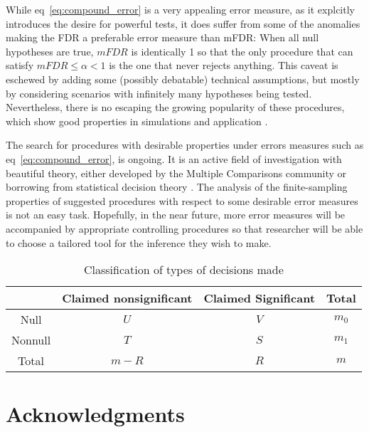 \documentclass[draft,12pt]{article}
\begin{document}
While eq~\ref{eq:compound_error} is a very appealing error measure, as it explcitly introduces the desire for powerful tests, it does suffer from some of the anomalies making the FDR a preferable error measure than mFDR: When all null hypotheses are true, $mFDR$ is identically 1 so that the only procedure that can satisfy $mFDR\leq \alpha <1$ is the one that never rejects anything. This caveat is eschewed by adding some (possibly debatable) technical assumptions, but mostly by considering scenarios with infinitely many hypotheses being tested. Nevertheless, there is no escaping the growing popularity of these procedures, which show good properties in simulations and application \citep[example][]{efron_microarrays_2008}.

The search for procedures with desirable properties under errors measures such as eq~\ref{eq:compound_error}, is ongoing. It is an active field of investigation with beautiful theory, either developed by the Multiple Comparisons community or borrowing from statistical decision theory \cite[see][]{sun_oracle_2007}. The analysis of the finite-sampling properties of suggested procedures with respect to some desirable error measures is not an easy task. Hopefully, in the near future, more error measures will be accompanied by appropriate controlling procedures so that researcher will be able to choose a tailored tool for the inference they wish to make.


\begin{table}
  \centering
\begin{tabular}{|c|c|c|c|}
\hline \rule[-1ex]{0pt}{1.5ex} & Claimed nonsignificant & Claimed Significant & Total \\ 
\hline
\hline \rule[-1ex]{0pt}{1.5ex} Null & $U$ & $V$ & $m_0$ \\ 
\hline \rule[-1ex]{0pt}{1.5ex} Nonnull & $T$ & $S$ & $m_1$ \\ 
\hline \rule[-1ex]{0pt}{1.5ex} Total & $m-R$ & $R$ & $m$ \\ 
\hline 
\end{tabular} 
  \caption{Classification of types of decisions made}
  \label{tab:event_notation}
\end{table}






\section{Acknowledgments}
\end{document}
